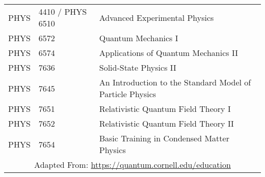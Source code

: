 {\begin{tabular}{ |p{1.5cm}||p{3cm}|p{9cm}| }
PHYS & 4410 / PHYS 6510 & Advanced Experimental Physics\\
PHYS & 6572 & Quantum Mechanics I\\
PHYS & 6574 & Applications of Quantum Mechanics II\\
PHYS & 7636 & Solid-State Physics II\\
PHYS & 7645 & An Introduction to the Standard Model of Particle Physics\\
PHYS & 7651 & Relativistic Quantum Field Theory I\\
PHYS & 7652 & Relativistic Quantum Field Theory II\\
PHYS & 7654 & Basic Training in Condensed Matter Physics\\
\hline
 \multicolumn{3}{|c|}{Adapted From: \url{https://quantum.cornell.edu/education}} \\
\hline
\end{tabular}
}